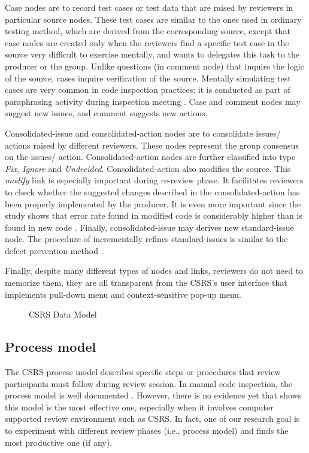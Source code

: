 Case nodes are to record test cases or test data that are raised by
reviewers in particular source nodes. These test cases are 
similar to the ones used in ordinary testing method, which are derived from
the corresponding source, except that case nodes are created only when the
reviewers find a specific test case in the source very difficult to
exercise mentally, and wants to delegates this task to the producer or the
group. Unlike questions (in comment node) that inquire the logic
of the source, cases inquire verification of the source. 
Mentally simulating test cases are very common in code inspection
practices; it is conducted as part of paraphrasing activity during
inspection meeting \cite{Russel91,Ackerman89}. 
Case and comment nodes may suggest new issues, and comment
suggests new actions.

Consolidated-issue and consolidated-action nodes are to consolidate
issues/ actions raised by different reviewers. These nodes represent
the group consensus on the issues/ action.
Consolidated-action nodes are further classified into type {\it Fix, Ignore}
and {\it Undecided}.
Consolidated-action also modifies the source. 
This {\it modify} link is especially important during re-review phase. It
facilitates reviewers to check whether the suggested changes described
in the consolidated-action has been properly implemented by the
producer. It is even more important since the study shows that error
rate found in modified code is considerably higher than is found in
new code \cite{Fagan76}. 
Finally, consolidated-issue may derives new standard-issue node. 
The procedure of incrementally refines standard-issues is similar to
the defect prevention method \cite{Jones85}.

Finally, despite many different types of nodes and links, reviewers do
not need to memorize  them, they are all transparent from the
CSRS's user interface that implements pull-down menu and
context-sensitive pop-up menu. 

\begin{figure}[htb]
  \caption{CSRS Data Model}
  \label{fig:data-model}
\end{figure}



\subsection {Process model}
The CSRS process model describes specific steps or procedures that
review participants must follow during review session.
In manual code inspection, the process model is well
documented \cite{Fagan76}. However, there is no evidence yet that shows this
model is the most effective one, especially when it involves
computer supported review environment such as CSRS.
In fact, one of our research goal is to experiment with
different review phases (i.e., process model) and finds the most
productive one (if any). 

